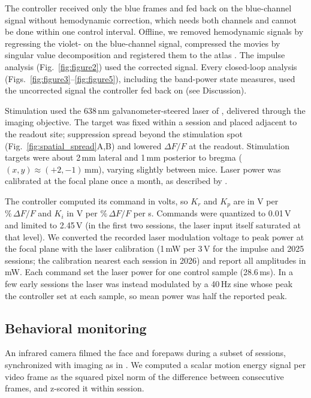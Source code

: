 The controller received only the blue frames and fed back on the blue-channel
signal without hemodynamic correction, which needs both channels and cannot be
done within one control interval. Offline, we removed hemodynamic signals by
regressing the violet- on the blue-channel signal, compressed the movies by
singular value decomposition and registered them to the atlas
\citep{Matveev2024}. The impulse analysis (Fig.~\ref{fig:figure2}) used the
corrected signal. Every closed-loop analysis
(Figs.~\ref{fig:figure3}--\ref{fig:figure5}), including the band-power state
measures, used the uncorrected signal the controller fed back on (see
Discussion).

Stimulation used the 638\,nm galvanometer-steered laser of
\citet{Matveev2024}, delivered through the imaging objective. The target was
fixed within a session and placed adjacent to the readout site; suppression
spread beyond the stimulation spot (Fig.~\ref{fig:spatial_spread}A,B) and lowered
$\Delta F/F$ at the readout. Stimulation targets were about 2\,mm lateral and
1\,mm posterior to bregma ($(x, y) \approx (+2, -1)$\,mm), varying slightly
between mice. Laser power was calibrated at the focal plane once a month, as described by
\citet{Matveev2024}.

The controller computed its command in volts, so $K_r$ and $K_p$ are in V per
$\%\,\Delta F/F$ and $K_i$ in V per $\%\,\Delta F/F$ per s. Commands were
quantized to 0.01\,V and limited to 2.45\,V (in the first two sessions, the laser
input itself saturated at that level). We converted the recorded laser
modulation voltage to peak power at the focal plane with the laser calibration
\citep{Matveev2024} (1\,mW per 3\,V for the impulse and 2025 sessions; the
calibration nearest each session in 2026) and report all amplitudes in mW. Each
command set the laser power for one control sample (28.6\,ms). In a few early
sessions the laser was instead modulated by a 40\,Hz sine whose peak the
controller set at each sample, so mean power was half the reported peak.

\subsection*{Behavioral monitoring}

An infrared camera filmed the face and forepaws during a subset of sessions,
synchronized with imaging as in \citet{Matveev2024}. We computed a scalar motion
energy signal per video frame as the squared pixel norm of the difference
between consecutive frames, and z-scored it within session.

